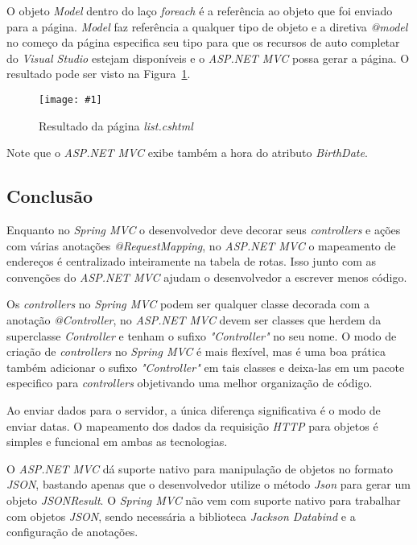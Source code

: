 \documentclass[a4paper,12pt]{article}
\newcommand{\figura}[3] {
	\begin{figure}[ht]
		\centering
		\texttt{[image: \#1]}
		\caption{#2}
		\label{#3}
	\end{figure}
	\FloatBarrier
}
\newcommand{\est}[1] {
\textit{#1}}
\newcommand{\classe}[1] {
\textit{#1}}
\newcommand{\arquivo}[1] {
\textit{#1}}
\newcommand{\sigla}[1] {
\textit{#1}}
\newcommand{\annotation}[1] {
\textit{#1}}
\newcommand{\metodo}[1] {
\textit{#1}}
\begin{document}
O objeto \est{Model} dentro do laço \est{foreach} é a referência ao objeto que foi enviado para a página. \est{Model} faz referência a qualquer tipo de objeto e a diretiva \est{@model} no começo da página especifica seu tipo para que os recursos de auto completar do \est{Visual Studio} estejam disponíveis e o \est{ASP.NET MVC} possa gerar a página. O resultado pode ser visto na Figura~\ref{fig:35}.

\figura{35.png}{Resultado da página \arquivo{list.cshtml}}{fig:35}

Note que o \est{ASP.NET MVC} exibe também a hora do atributo \est{BirthDate}.

\subsection{Conclusão}

Enquanto no \est{Spring MVC} o desenvolvedor deve decorar seus \est{controllers} e ações com várias anotações \annotation{@RequestMapping}, no \est{ASP.NET MVC} o mapeamento de endereços é centralizado inteiramente na tabela de rotas. Isso junto com as convenções do \est{ASP.NET MVC} ajudam o desenvolvedor a escrever menos código.

Os \est{controllers} no \est{Spring MVC} podem ser qualquer classe decorada com a anotação \annotation{@Controller}, no \est{ASP.NET MVC} devem ser classes que herdem da superclasse \classe{Controller} e tenham o sufixo \est{"Controller"} no seu nome. O modo de criação de \est{controllers} no \est{Spring MVC} é mais flexível, mas é uma boa prática também adicionar o sufixo \est{"Controller"} em tais classes e deixa-las em um pacote especifico para \est{controllers} objetivando uma melhor organização de código.

Ao enviar dados para o servidor, a única diferença significativa é o modo de enviar datas. O mapeamento dos dados da requisição \sigla{HTTP} para objetos é simples e funcional em ambas as tecnologias.

O \est{ASP.NET MVC} dá suporte nativo para manipulação de objetos no formato \sigla{JSON}, bastando apenas que o desenvolvedor utilize o método \metodo{Json} para gerar um objeto \classe{JSONResult}. O \est{Spring MVC} não vem com suporte nativo para trabalhar com objetos \sigla{JSON}, sendo necessária a biblioteca \est{Jackson Databind} e a configuração de anotações.
\end{document}
